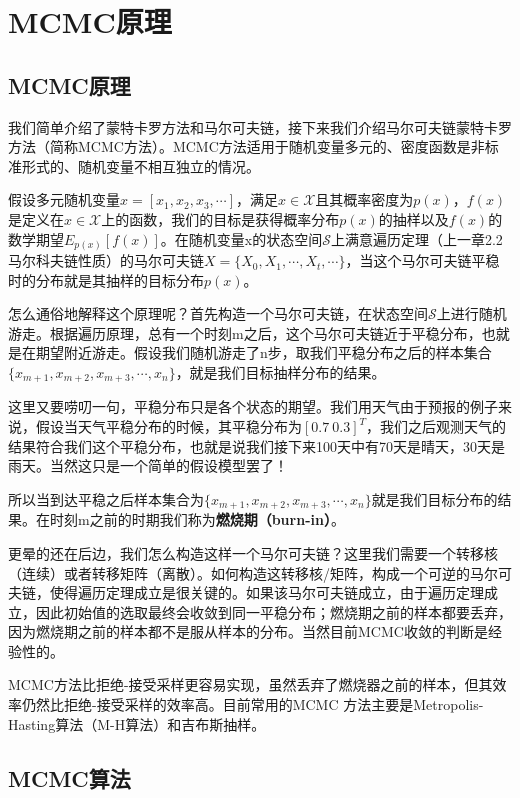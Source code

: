 \section{MCMC原理}

\subsection{MCMC原理}

我们简单介绍了蒙特卡罗方法和马尔可夫链，接下来我们介绍马尔可夫链蒙特卡罗方法（简称MCMC方法）。MCMC方法适用于随机变量多元的、密度函数是非标准形式的、随机变量不相互独立的情况。

假设多元随机变量\(x = [x_{1},x_{2},x_{3},\cdots]\)，满足\(x\in \mathcal{X}\)且其概率密度为\(p(x)\)，\(f(x)\)是定义在\(x\in \mathcal{X}\)上的函数，我们的目标是获得概率分布\(p(x)\)的抽样以及\(f(x)\)的数学期望\(E_{p(x)}[f(x)]\)。在随机变量x的状态空间\(\mathcal{S}\)上满意遍历定理（上一章2.2马尔科夫链性质）的马尔可夫链\(X = \{X_0,X_1,\cdots,X_t,\cdots\}\)，当这个马尔可夫链平稳时的分布就是其抽样的目标分布\(p(x)\)。

怎么通俗地解释这个原理呢？首先构造一个马尔可夫链，在状态空间\(\mathcal{S}\)上进行随机游走。根据遍历原理，总有一个时刻m之后，这个马尔可夫链近于平稳分布，也就是在期望附近游走。假设我们随机游走了n步，取我们平稳分布之后的样本集合\(\{x_{m+1},x_{m+2},x_{m+3},\cdots,x_{n}\}\)，就是我们目标抽样分布的结果。

这里又要唠叨一句，平稳分布只是各个状态的期望。我们用天气由于预报的例子来说，假设当天气平稳分布的时候，其平稳分布为\([0.7 \ 0.3]^T\)，我们之后观测天气的结果符合我们这个平稳分布，也就是说我们接下来100天中有70天是晴天，30天是雨天。当然这只是一个简单的假设模型罢了！

所以当到达平稳之后样本集合为\(\{x_{m+1},x_{m+2},x_{m+3},\cdots,x_{n}\}\)就是我们目标分布的结果。在时刻m之前的时期我们称为\textbf{燃烧期（burn-in）}。

更晕的还在后边，我们怎么构造这样一个马尔可夫链？这里我们需要一个转移核（连续）或者转移矩阵（离散）。如何构造这转移核/矩阵，构成一个可逆的马尔可夫链，使得遍历定理成立是很关键的。如果该马尔可夫链成立，由于遍历定理成立，因此初始值的选取最终会收敛到同一平稳分布；燃烧期之前的样本都要丢弃，因为燃烧期之前的样本都不是服从样本的分布。当然目前MCMC收敛的判断是经验性的。

MCMC方法比拒绝-接受采样更容易实现，虽然丢弃了燃烧器之前的样本，但其效率仍然比拒绝-接受采样的效率高。目前常用的MCMC
方法主要是Metropolis-Hasting算法（M-H算法）和吉布斯抽样。

\hypertarget{32-mcmcux7b97ux6cd5}{%
\subsection{MCMC算法}\label{32-mcmcux7b97ux6cd5}}


